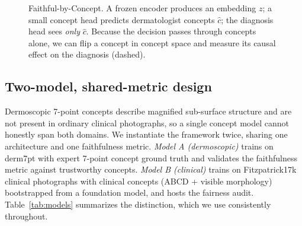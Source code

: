 \documentclass{svproc}
\begin{document}
\begin{figure}[t]
\centering
{}
\caption{Faithful-by-Concept. A frozen encoder produces an embedding $z$; a small
concept head predicts dermatologist concepts $\hat c$; the diagnosis head sees
\emph{only} $\hat c$. Because the decision passes through concepts alone, we can flip a
concept in concept space and measure its causal effect on the diagnosis (dashed).}
\label{fig:arch}
\end{figure}

\subsection{Two-model, shared-metric design}
Dermoscopic 7-point concepts describe magnified sub-surface structure and are not
present in ordinary clinical photographs, so a single concept model cannot honestly
span both domains. We instantiate the framework twice, sharing one architecture and
one faithfulness metric. \emph{Model A (dermoscopic)} trains on derm7pt with expert
7-point concept ground truth and validates the faithfulness metric against trustworthy
concepts. \emph{Model B (clinical)} trains on Fitzpatrick17k clinical photographs with
clinical concepts (ABCD + visible morphology) bootstrapped from a foundation model,
and hosts the fairness audit. Table~\ref{tab:models} summarizes the distinction, which
we use consistently throughout.
\end{document}
